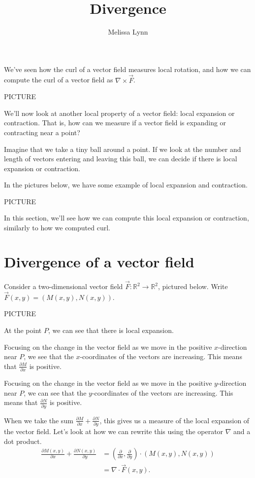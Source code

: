 \documentclass{ximera}
\title{Divergence}
\author{Melissa Lynn}
\begin{document}
  
\begin{abstract}  
\end{abstract}  
\maketitle  

We've seen how the curl of a vector field measures local rotation, and how we can compute the curl of a vector field as $\nabla\times \vec{F}$.

PICTURE

We'll now look at another local property of a vector field: local expansion or contraction. That is, how can we measure if a vector field is expanding or contracting near a point?

Imagine that we take a tiny ball around a point. If we look at the number and length of vectors entering and leaving this ball, we can decide if there is local expansion or contraction.

In the pictures below, we have some example of local expansion and contraction.

PICTURE

In this section, we'll see how we can compute this local expansion or contraction, similarly to how we computed curl.

\section*{Divergence of a vector field}

Consider a two-dimensional vector field $\vec{F}:\mathbb{R}^2\rightarrow\mathbb{R}^2$, pictured below. Write $\vec{F}(x,y) = (M(x,y), N(x,y))$.

PICTURE

At the point $P$, we can see that there is local expansion.

Focusing on the change in the vector field as we move in the positive $x$-direction near $P$, we see that the $x$-coordinates of the vectors are increasing. This means that $\frac{\partial M}{\partial x}$ is positive.

Focusing on the change in the vector field as we move in the positive $y$-direction near $P$, we can see that the $y$-coordinates of the vectors are increasing. This means that $\frac{\partial N}{\partial y}$ is positive.

When we take the sum $\frac{\partial M}{\partial x} + \frac{\partial N}{\partial y}$, this gives us a measure of the local expansion of the vector field. Let's look at how we can rewrite this using the operator $\nabla$ and a dot product.
\begin{align*}
\frac{\partial M(x,y)}{\partial x} + \frac{\partial N(x,y)}{\partial y} &= \left(\frac{\partial}{\partial x}, \frac{\partial}{\partial y}\right)\cdot (M(x,y), N(x,y))\\
&= \nabla \cdot \vec{F}(x,y).
\end{align*}
\end{document}

